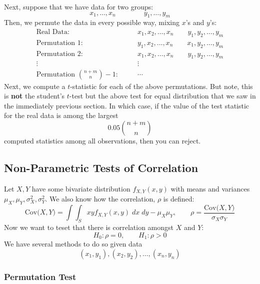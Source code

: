 \documentclass[a4paper,12pt]{scrartcl}
\begin{document}
Next, suppose that we have data for two groups:
   \[ x_1, \ldots, x_n \qquad \qquad y_1, \ldots, y_m \]
Then, we permute the data in every possible way, mixing $x$'s and
$y$'s:
\begin{align*}
   \text{Real Data:} & \qquad 
      x_1, x_2, \ldots, x_n \qquad y_1, y_2, \ldots, y_m\\
   \text{Permutation 1:} & \qquad
      y_1, x_2, \ldots, x_n \qquad x_1, y_2, \ldots, y_m\\
   \text{Permutation 2:} & \qquad
      x_1, x_2, \ldots, x_n \qquad y_1, y_2, \ldots, y_m\\
   \vdots \qquad & \qquad \vdots\\
   \text{Permutation $\binom{n+m}{n}-1$:} & \qquad \cdots
\end{align*}
Next, we compute a $t$-statistic for each of the above permutations. 
But note, this is \textbf{not} the student's $t$-test but the
above test for equal distribution that we saw in the immediately
previous section.  In which case, if the value of the test statistic
for the real data is among the largest
   \[ 0.05 \binom{n+m}{n} \]
computed statistics among all observations, then you can reject.


\newpage
\subsection{Non-Parametric Tests of Correlation}

Let $X,Y$ have some bivariate distribution $f_{X,Y}(x,y)$ with
means and variances $\mu_X, \mu_Y, \sigma^2_X, \sigma^2_Y$.
We also know how the correlation, $\rho$ is defined:
\[ \text{Cov($X,Y$)} = \int\int_S xy f_{X,Y}(x,y) \; dx \; dy - 
   \mu_X \mu_Y, \qquad \rho = \frac{\text{Cov($X,Y$)}}{\sigma_X
   \sigma_Y} \]
Now we want to teset that there is correlation amongst $X$ and $Y$:
   \[ H_0: \rho = 0, \qquad H_1: \rho > 0 \]
We have several methods to do so given data
   \[ (x_1, y_1), (x_2, y_2), \ldots, (x_n, y_n) \]

\subsubsection{Permutation Test}
\end{document}
